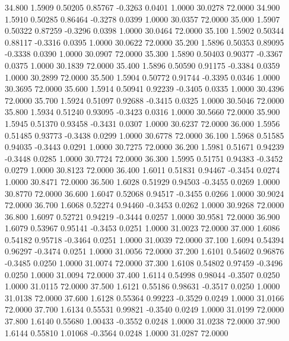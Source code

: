   34.800   1.5909   0.50205   0.85767  -0.3263   0.0401   1.0000  30.0278  72.0000
  34.900   1.5910   0.50285   0.86464  -0.3278   0.0399   1.0000  30.0357  72.0000
  35.000   1.5907   0.50322   0.87259  -0.3296   0.0398   1.0000  30.0464  72.0000
  35.100   1.5902   0.50344   0.88117  -0.3316   0.0395   1.0000  30.0622  72.0000
  35.200   1.5896   0.50353   0.89095  -0.3338   0.0390   1.0000  30.0907  72.0000
  35.300   1.5890   0.50403   0.90377  -0.3367   0.0375   1.0000  30.1839  72.0000
  35.400   1.5896   0.50590   0.91175  -0.3384   0.0359   1.0000  30.2899  72.0000
  35.500   1.5904   0.50772   0.91744  -0.3395   0.0346   1.0000  30.3695  72.0000
  35.600   1.5914   0.50941   0.92239  -0.3405   0.0335   1.0000  30.4396  72.0000
  35.700   1.5924   0.51097   0.92688  -0.3415   0.0325   1.0000  30.5046  72.0000
  35.800   1.5934   0.51240   0.93095  -0.3423   0.0316   1.0000  30.5660  72.0000
  35.900   1.5945   0.51370   0.93458  -0.3431   0.0307   1.0000  30.6237  72.0000
  36.000   1.5956   0.51485   0.93773  -0.3438   0.0299   1.0000  30.6778  72.0000
  36.100   1.5968   0.51585   0.94035  -0.3443   0.0291   1.0000  30.7275  72.0000
  36.200   1.5981   0.51671   0.94239  -0.3448   0.0285   1.0000  30.7724  72.0000
  36.300   1.5995   0.51751   0.94383  -0.3452   0.0279   1.0000  30.8123  72.0000
  36.400   1.6011   0.51831   0.94467  -0.3454   0.0274   1.0000  30.8471  72.0000
  36.500   1.6028   0.51929   0.94503  -0.3455   0.0269   1.0000  30.8770  72.0000
  36.600   1.6047   0.52068   0.94517  -0.3455   0.0266   1.0000  30.9024  72.0000
  36.700   1.6068   0.52274   0.94460  -0.3453   0.0262   1.0000  30.9268  72.0000
  36.800   1.6097   0.52721   0.94219  -0.3444   0.0257   1.0000  30.9581  72.0000
  36.900   1.6079   0.53967   0.95141  -0.3453   0.0251   1.0000  31.0023  72.0000
  37.000   1.6086   0.54182   0.95718  -0.3464   0.0251   1.0000  31.0039  72.0000
  37.100   1.6094   0.54394   0.96297  -0.3474   0.0251   1.0000  31.0056  72.0000
  37.200   1.6101   0.54602   0.96876  -0.3485   0.0250   1.0000  31.0074  72.0000
  37.300   1.6108   0.54802   0.97459  -0.3496   0.0250   1.0000  31.0094  72.0000
  37.400   1.6114   0.54998   0.98044  -0.3507   0.0250   1.0000  31.0115  72.0000
  37.500   1.6121   0.55186   0.98631  -0.3517   0.0250   1.0000  31.0138  72.0000
  37.600   1.6128   0.55364   0.99223  -0.3529   0.0249   1.0000  31.0166  72.0000
  37.700   1.6134   0.55531   0.99821  -0.3540   0.0249   1.0000  31.0199  72.0000
  37.800   1.6140   0.55680   1.00433  -0.3552   0.0248   1.0000  31.0238  72.0000
  37.900   1.6144   0.55810   1.01068  -0.3564   0.0248   1.0000  31.0287  72.0000
